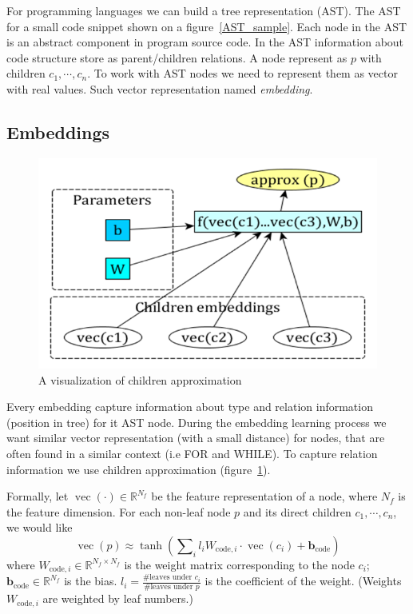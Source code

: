 \documentclass[11pt,technote]{IEEEtran}
\DeclareMathOperator{\vect}{vec}
\begin{document}
For programming languages we can build a tree representation (AST).
The AST for a small code snippet shown on a figure~\ref{AST_sample}.
Each node in the AST is an abstract component in program source code.
In the AST information about code structure store as parent/children relations.
A node represent as $p$ with children $c_1, \cdots, c_n$.
To work with AST nodes we need to represent them as vector with real values. 
Such vector representation named \textit{embedding}.



\subsection{Embeddings}
\begin{figure}
\includegraphics[scale=0.3]{children_approx.png}
\caption{A visualization of children approximation}
\label{child_approx}
\end{figure}
Every embedding capture information about type and relation information (position in tree) for it AST node.
During the embedding learning process we want similar vector representation (with a small distance) for nodes, that are often found in a similar context (i.e FOR and WHILE). To capture relation information we use children approximation (figure~\ref{child_approx}). 

Formally, let $\vect(\cdot) \in \mathbb{R}^{N_f}$ be
the feature representation of a node, where $N_f$ is the feature dimension.
For each non-leaf node $p$ and its direct children $c_1, \cdots, c_n$, we would like
\begin{equation}
\vect(p) \approx \tanh\left(\sum\nolimits_i l_iW_{\text{code},i}\cdot \vect(c_i) + \bm b_{\text{code}}\right)
\label{eCode}
\end{equation}
\noindent where $W_{\text{code},i}\in\mathbb{R}^{N_f\times N_f}$ is the weight
matrix corresponding to the node $c_i$; $\bm b_{\text{code}}\in \mathbb{R}^{N_f}$ is the bias.
$l_i = \frac{\#\text{leaves under } c_i}{\#\text{leaves under } p}$ is the coefficient of the weight.
(Weights $W_{\text{code},i}$ are weighted by leaf numbers.)
\end{document}
